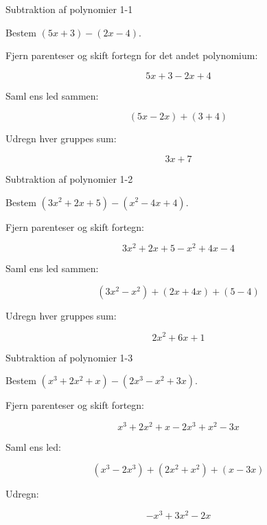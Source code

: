 \documentclass{article}
\begin{document}

\tableofcontents
\newpage

\begin{exercise}{Subtraktion af polynomier 1-1}

Bestem $(5x + 3) - (2x - 4)$.


\hint

Fjern parenteser og skift fortegn for det andet polynomium:

\hint
\[
5x + 3 - 2x + 4
\]

\hint

Saml ens led sammen:

\hint
\[
(5x - 2x) + (3 + 4)
\]

\hint

Udregn hver gruppes sum:

\hint
\[
3x + 7
\]

\end{exercise}

\newpage

\begin{exercise}{Subtraktion af polynomier 1-2}

Bestem $(3x^2 + 2x + 5) - (x^2 - 4x + 4)$.


\hint

Fjern parenteser og skift fortegn:

\hint
\[
3x^2 + 2x + 5 - x^2 + 4x - 4
\]

\hint

Saml ens led sammen:

\hint
\[
(3x^2 - x^2) + (2x + 4x) + (5 - 4)
\]

\hint

Udregn hver gruppes sum:

\hint
\[
2x^2 + 6x + 1
\]

\end{exercise}

\newpage

\begin{exercise}{Subtraktion af polynomier 1-3}

Bestem $(x^3 + 2x^2 + x) - (2x^3 - x^2 + 3x)$.


\hint

Fjern parenteser og skift fortegn:

\hint
\[
x^3 + 2x^2 + x - 2x^3 + x^2 - 3x
\]

\hint

Saml ens led:

\hint
\[
(x^3 - 2x^3) + (2x^2 + x^2) + (x - 3x)
\]

\hint

Udregn:

\hint
\[
-x^3 + 3x^2 - 2x
\]

\end{exercise}
\end{document}
